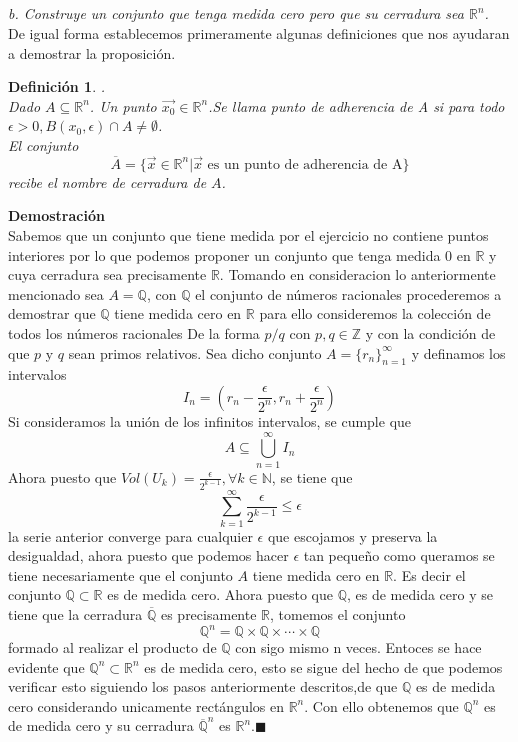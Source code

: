 \documentclass[a4paper,12pt]{article}
\newtheorem{definicion}{Definición}[subsection]
\begin{document}
\subsection{}
\textit{b. Construye un conjunto que tenga medida cero pero que su cerradura sea $\mathbb{R}^n$.\\}
De igual forma establecemos primeramente algunas definiciones que nos ayudaran a demostrar la proposición.
\begin{definicion}.\\
Dado $A \subseteq \mathbb{R}^n$. Un punto $\vec{x_0} \in  \mathbb{R}^n$.Se llama punto de adherencia de A si para todo
$\epsilon > 0, B(x_0,\epsilon) \cap A \not = \emptyset$.\\
El conjunto
\[\overline{A} = \lbrace \vec{x} \in \mathbb{R}^n | \vec{x} \text{ es un punto de adherencia de A} \rbrace\]
recibe el nombre de cerradura de $A$.
\end{definicion}
\textbf{Demostración}\\
Sabemos que un conjunto que tiene medida por el ejercicio no contiene puntos interiores por lo que podemos proponer un
conjunto que tenga medida 0 en $\mathbb{R}$ y cuya cerradura sea precisamente $\mathbb{R}$. Tomando en consideracion lo
anteriormente mencionado sea $A = \mathbb{Q}$, con $\mathbb{Q}$ el conjunto de números racionales procederemos a demostrar
que $\mathbb{Q}$ tiene medida cero en $\mathbb{R}$ para ello consideremos la colección de todos los números racionales De
la forma $p/q$ con $p,q \in \mathbb{Z}$ y con la condición de que $p$ y $q$ sean primos relativos. Sea dicho conjunto
$A = \lbrace r_n\rbrace_{n = 1}^\infty$ y definamos los intervalos
\[I_n = (r_n- \frac{\epsilon}{2^n} , r_n +\frac{\epsilon}{2^n} )\]
Si consideramos la unión de los infinitos intervalos, se cumple que
\[ A \subseteq \bigcup_{n = 1}^\infty I_n \]
Ahora puesto que $Vol(U_k) = \frac{\epsilon}{2^{k-1}}, \forall k \in \mathbb{N}$, se tiene que
\[\sum_{k = 1}^{\infty} \frac{\epsilon}{2^{k-1}} \leq \epsilon \]
la serie anterior converge para cualquier $\epsilon$ que escojamos y preserva la desigualdad, ahora puesto que podemos hacer
$\epsilon$ tan pequeño como queramos se tiene necesariamente que el conjunto $A$ tiene medida cero en $\mathbb{R}$.
Es decir el conjunto $\mathbb{Q} \subset \mathbb{R}$ es de medida cero.
Ahora puesto que $\mathbb{Q}$, es de medida cero y se tiene que la cerradura $\overline{\mathbb{Q}}$ es precisamente
$\mathbb{R}$, tomemos el conjunto
\[\mathbb{Q}^n = \mathbb{Q} \times \mathbb{Q} \times \cdots  \times \mathbb{Q} \]
formado al realizar el producto de $\mathbb{Q}$ con sigo mismo n veces. Entoces se hace evidente que
$\mathbb{Q}^n \subset \mathbb{R}^n$ es de medida cero, esto se sigue del hecho de que podemos verificar esto siguiendo los pasos
anteriormente descritos,de que $\mathbb{Q}$ es de medida cero considerando unicamente rectángulos en $\mathbb{R}^n$.
Con ello obtenemos que $\mathbb{Q}^n$ es de medida cero y su cerradura $\overline{\mathbb{Q}}^n$ es $\mathbb{R}^n$.$\blacksquare$
\end{document}
